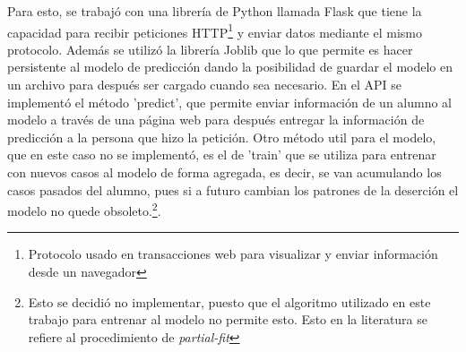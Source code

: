 Para esto, se trabajó con una librería de Python llamada Flask que tiene la capacidad para recibir peticiones HTTP\footnote{Protocolo usado en transacciones web para visualizar y enviar información desde un navegador} y enviar datos mediante el mismo protocolo. Además se utilizó la librería Joblib que lo que permite es hacer persistente al modelo de predicción dando la posibilidad de guardar el modelo en un archivo para después ser cargado cuando sea necesario.
En el API se implementó el método 'predict', que permite enviar información de un alumno al modelo a través de una página web para después entregar la información de predicción a la persona que hizo la petición. Otro método util para el modelo, que en este caso no se implementó, es el de 'train' que se utiliza para entrenar con nuevos casos al modelo de forma agregada, es decir, se van acumulando los casos pasados del alumno, pues si a futuro cambian los patrones de la deserción el modelo no quede obsoleto.\footnote{Esto se decidió no implementar, puesto que el algoritmo utilizado en este trabajo para entrenar al modelo no permite esto. Esto en la literatura se refiere al procedimiento de \textit{partial-fit}}.

